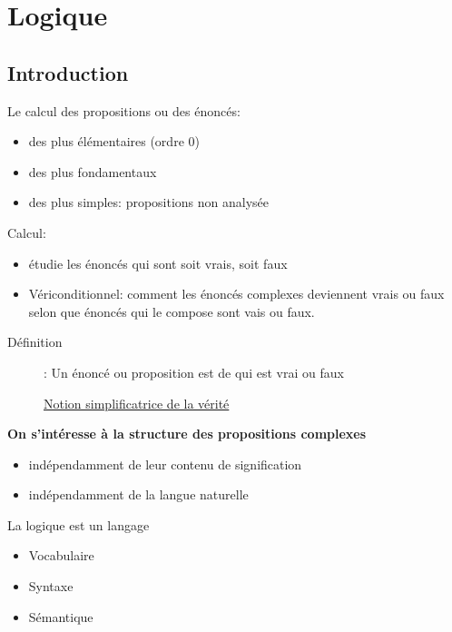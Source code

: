 \documentclass[10pt,a4paper]{article}
\begin{document}
\section{Logique}
	\subsection{Introduction}
		Le calcul des propositions ou des énoncés:
		\begin{itemize}
			\item des plus élémentaires (ordre 0)
			\item des plus fondamentaux
			\item des plus simples: propositions non analysée
		\end{itemize}
		Calcul: 
		\begin{itemize}
			\item étudie les énoncés qui sont soit vrais, soit faux
			\item Vériconditionnel: comment les énoncés complexes deviennent vrais ou faux selon que énoncés qui le compose sont vais ou faux.
		\end{itemize}
		\begin{description}
			\item[Définition]: Un énoncé ou proposition est de qui est vrai ou faux
				\begin{center}
					\underline{Notion simplificatrice de la vérité}
				\end{center}
		\end{description}
		\textbf{On s’intéresse à la structure des propositions complexes}
		\begin{itemize}
			\item indépendamment de leur contenu de signification
			\item indépendamment de la langue naturelle
		\end{itemize}
		La logique est un langage
		\begin{itemize}
			\item Vocabulaire
			\item Syntaxe
			\item Sémantique
		\end{itemize}
\end{document}
